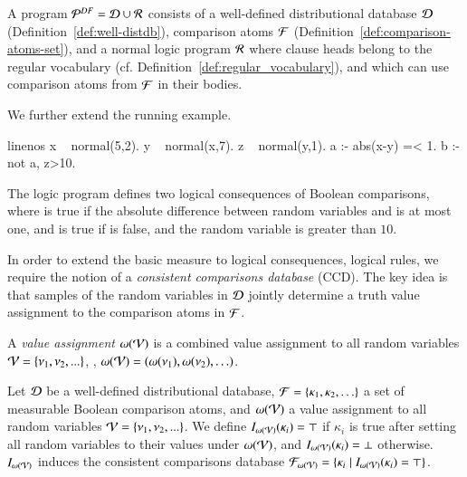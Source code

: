 \begin{definition}\label{def:core-prog}
A \dfplpsty program ${{\mathcal{P}}^{DF}}= \mathcal{D} \cup {\mathcal{R}} $ consists of a well-defined distributional database $\mathcal{D}$ (Definition~\ref{def:well-distdb}), comparison atoms $\mathcal{F}$ (Definition~\ref{def:comparison-atoms-set}), and a normal logic program ${\mathcal{R}}$ where clause heads belong to the regular vocabulary (cf. Definition~\ref{def:regular_vocabulary}), and which can use comparison atoms from $\mathcal{F}$ in their bodies.
\end{definition}

\begin{example}\label{ex:random_choice_dependency}
We further extend the running example.
\begin{problog*}{linenos}
x ~ normal(5,2).
y ~ normal(x,7).
z ~ normal(y,1).
a :- abs(x-y) =< 1. 
b :- not a, z>10.
\end{problog*}
The logic program defines two logical consequences of Boolean comparisons, where  is true if the absolute difference between random variables  and  is at most one, and  is true if  is false, and the random variable  is greater than $10$. 
\end{example}

In order to extend the basic measure to logical consequences, \ie logical rules, we require the notion of a {\em consistent comparisons database} (CCD).
The key idea is that samples of the random variables in $\mathcal{D}$ jointly determine a truth value assignment to the comparison atoms in $\mathcal{F}$.


\begin{definition}
    A {\em value assignment}
    $\omega(\mathcal{V})$ is a combined value assignment to all random variables $\mathcal{V}=\{\nu_1,\nu_2,... \}$, \ie,  $\omega(\mathcal{V})=(\omega(\nu_1),\omega(\nu_2),\ldots)$.
\end{definition}


\begin{definition}\label{def:consistent-fact-db}
    Let $\mathcal{D}$ be a well-defined distributional database,  $\mathcal{F}=\{\kappa_1, \kappa_2,\ldots\}$ a set of measurable Boolean comparison atoms, and  $\omega(\mathcal{V})$ a  value assignment to all random variables $\mathcal{V}=\{ \nu_1,\nu_2,... \}$. 
    We define $I_{\omega(\mathcal{V})}(\kappa_i)=\top$ if $\kappa_i$ is true after setting all random variables to their values under $\omega(\mathcal{V})$, and $I_{\omega(\mathcal{V})}(\kappa_i) = \bot$ otherwise. $I_{\omega(\mathcal{V})}$ induces the consistent comparisons database $\mathcal{F}_{\omega(\mathcal{V})}=\{\kappa_i \mid I_{\omega(\mathcal{V})}(\kappa_i) = \top\}$.
\end{definition}

